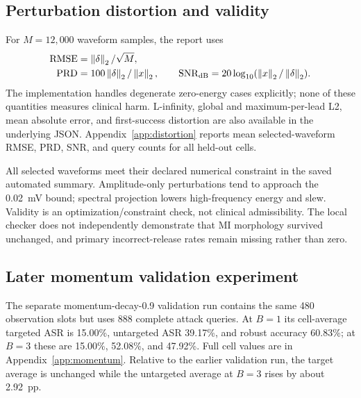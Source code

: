 \begin{table}[htbp]\centering\scriptsize
\resizebox{\linewidth}{!}{}
\caption{Adaptive-minus-PGD paired differences on held-out automated endpoints, in pp with retrospective pointwise patient-bootstrap 95\% intervals. Clinical-primary differences remain not evaluable.}\label{tab:securitypaired}\end{table}

\subsection{Perturbation distortion and validity}
For $M=12,000$ waveform samples, the report uses
\begin{align}
\mathrm{RMSE}&=\left\lVert \delta\right\rVert_2/\sqrt{M},\\
\mathrm{PRD}&=100\left\lVert \delta\right\rVert_2/\left\lVert x\right\rVert_2,\qquad
\mathrm{SNR}_{\mathrm{dB}}=20\log_{10}(\left\lVert x\right\rVert_2/\left\lVert \delta\right\rVert_2).
\end{align}
The implementation handles degenerate zero-energy cases explicitly; none of these quantities measures clinical harm. L-infinity, global and maximum-per-lead L2, mean absolute error, and first-success distortion are also available in the underlying JSON. Appendix~\ref{app:distortion} reports mean selected-waveform RMSE, PRD, SNR, and query counts for all held-out cells.

All selected waveforms meet their declared numerical constraint in the saved automated summary. Amplitude-only perturbations tend to approach the 0.02~mV bound; spectral projection lowers high-frequency energy and slew. Validity is an optimization/constraint check, not clinical admissibility. The local checker does not independently demonstrate that MI morphology survived unchanged, and primary incorrect-release rates remain missing rather than zero.

\subsection{Later momentum validation experiment}
The separate momentum-decay-0.9 validation run contains the same 480 observation slots but uses 888 complete attack queries. At $B=1$ its cell-average targeted ASR is 15.00\%, untargeted ASR 39.17\%, and robust accuracy 60.83\%; at $B=3$ these are 15.00\%, 52.08\%, and 47.92\%. Full cell values are in Appendix~\ref{app:momentum}. Relative to the earlier validation run, the target average is unchanged while the untargeted average at $B=3$ rises by about 2.92~pp.

